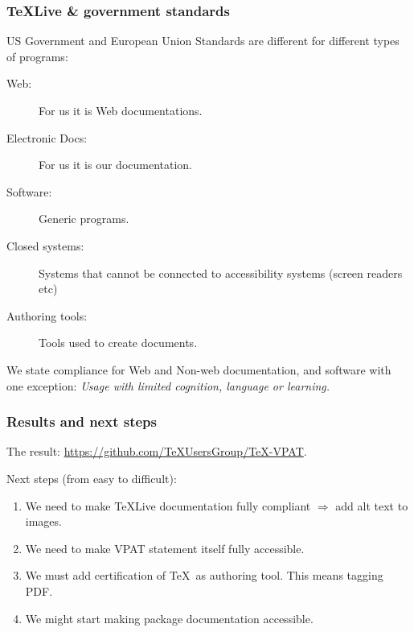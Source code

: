 \documentclass{beamer}
\begin{document}
\begin{frame}
  \frametitle{\TeX Live \& government standards}

  US Government and European Union Standards are different for
  different types of programs:
  \begin{description}
  \item[Web:]  For us it is Web documentations.
  \item[Electronic Docs:] For us it is our documentation.
  \item[Software:] Generic programs.
  \item[Closed systems:] Systems that cannot be connected to
    accessibility systems (screen readers etc)
  \item[Authoring tools:] Tools used to create documents.  
  \end{description}

  We state compliance for Web and Non-web documentation, and software
  with one exception: \emph{Usage with limited cognition, language or
    learning.}  
  
\end{frame}

\begin{frame}
  \frametitle{Results and next steps}
  The result:  \url{https://github.com/TeXUsersGroup/TeX-VPAT}.

  Next steps (from easy to difficult):
  \begin{enumerate}
  \item We need to make \TeX Live documentation fully compliant
    $\Rightarrow$ add alt text to images.
  \item We need to make VPAT statement itself fully accessible.
  \item We must add certification of \TeX\ as authoring tool.  This
    means tagging PDF.
  \item We might start making package documentation accessible.  
  \end{enumerate}

\end{frame}
\end{document}
